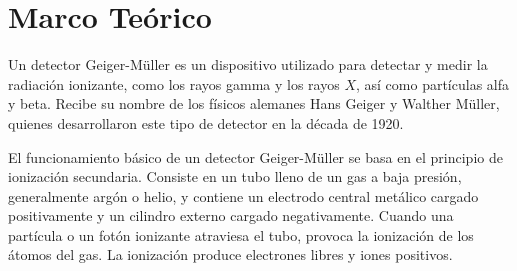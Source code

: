 \documentclass[conference]{IEEEtran}
\begin{document}
%
    
\section{Marco Teórico}


Un detector Geiger-Müller es un dispositivo utilizado para detectar y medir la radiación ionizante, como los rayos gamma y los rayos $X$, así como partículas alfa y beta. Recibe su nombre de los físicos alemanes Hans Geiger y Walther Müller, quienes desarrollaron este tipo de detector en la década de 1920.

El funcionamiento básico de un detector Geiger-Müller se basa en el principio de ionización secundaria. Consiste en un tubo lleno de un gas a baja presión, generalmente argón o helio, y contiene un electrodo central metálico cargado positivamente y un cilindro externo cargado negativamente. Cuando una partícula o un fotón ionizante atraviesa el tubo, provoca la ionización de los átomos del gas. La ionización produce electrones libres y iones positivos.
\end{document}
